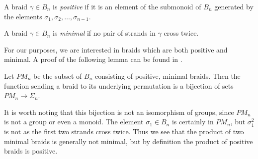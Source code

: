 \begin{Defi}
A braid $\gamma \in B_{n}$ is \textit{positive} if it is an element of the submonoid of $B_{n}$ generated by the elements $\sigma_{1}, \sigma_{2}, \ldots, \sigma_{n-1}$.
\end{Defi}

\begin{Defi}
 A braid $\gamma \in B_{n}$ is \textit{minimal} if no pair of strands in $\gamma$ cross twice.
\end{Defi}

For our purposes, we are interested in braids which are both positive and minimal. A proof of the following lemma can be found in \cite{EM2}.

\begin{lem}\label{pmlem}
Let $PM_{n}$ be the subset of $B_{n}$ consisting of positive, minimal braids. Then the function sending a braid to its underlying permutation is a bijection of sets $PM_{n} \rightarrow \Sigma_{n}$.
\end{lem}

\begin{rem}\label{pmrem}
It is worth noting that this bijection is not an isomorphism of groups, since $PM_{n}$ is not a group or even a monoid. The element $\sigma_{1} \in B_{n}$ is certainly in $PM_{n}$, but $\sigma_{1}^{2}$ is not as the first two strands cross twice. Thus we see that the product of two minimal braids is generally not minimal, but by definition the product of positive braids is positive.
\end{rem}

